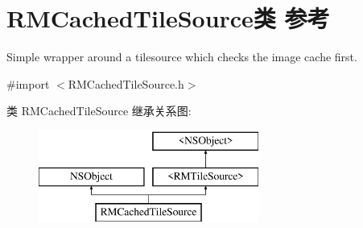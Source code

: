 \hypertarget{interface_r_m_cached_tile_source}{\section{R\-M\-Cached\-Tile\-Source类 参考}
\label{interface_r_m_cached_tile_source}
}


Simple wrapper around a tilesource which checks the image cache first.  




{\ttfamily \#import $<$R\-M\-Cached\-Tile\-Source.\-h$>$}

类 R\-M\-Cached\-Tile\-Source 继承关系图\-:\begin{figure}[H]
\begin{center}
\leavevmode
\includegraphics[height=3.000000cm]{interface_r_m_cached_tile_source}
\end{center}
\end{figure}
